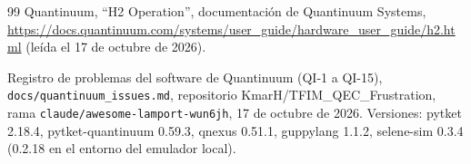 \documentclass[11pt,a4paper]{article}
\begin{document}
\begin{thebibliography}{99}
 Quantinuum, ``H2 Operation'', documentaci\'on de Quantinuum Systems, \url{https://docs.quantinuum.com/systems/user_guide/hardware_user_guide/h2.html} (le\'ida el 17 de octubre de 2026).

 Registro de problemas del software de Quantinuum (QI-1 a QI-15), \texttt{docs/quantinuum\_issues.md}, repositorio KmarH/TFIM\_QEC\_Frustration, rama \texttt{claude/awesome-lamport-wun6jh}, 17 de octubre de 2026. Versiones: pytket 2.18.4, pytket-quantinuum 0.59.3, qnexus 0.51.1, guppylang 1.1.2, selene-sim 0.3.4 (0.2.18 en el entorno del emulador local).

\end{thebibliography}
\end{document}
